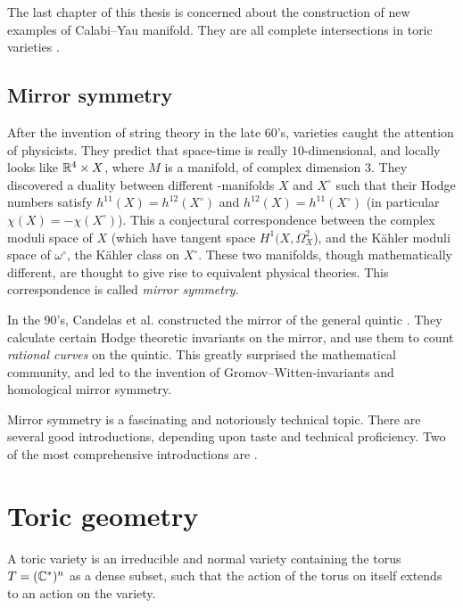 The last chapter of this thesis is concerned about the construction of new examples of Calabi--Yau manifold. They are all complete intersections in toric varieties .

\subsection{Mirror symmetry}

After the invention of string theory in the late 60's, \CY varieties caught the attention of physicists. They predict that space-time is really $10$-dimensional, and locally looks like $\mathbb{R}^4 \times X$, where $M$ is a \CY manifold, of complex dimension $3$. They discovered a duality between different -manifolds $X$ and $X^\circ$ such that their Hodge numbers satisfy $h^{11}(X) = h^{12}(X^\circ)$ and $h^{12}(X)=h^{11}(X^\circ)$ (in particular $\chi(X) = - \chi(X^\circ)$). This a conjectural correspondence between the complex moduli space of $X$ (which have tangent space $H^1(X,\Omega_X^2$), and the Kähler moduli space of $\omega^\circ$, the Kähler class on $X^\circ$. These two manifolds, though mathematically different, are thought to give rise to equivalent physical theories. This correspondence is called \emph{mirror symmetry}.

In the 90's, Candelas et al. constructed the mirror of the general quintic \cite{candelas_string}. They calculate certain Hodge theoretic invariants on the mirror, and use them to count \emph{rational curves} on the quintic. This greatly surprised the mathematical community, and led to the invention of Gromov--Witten-invariants and homological mirror symmetry.

Mirror symmetry is a fascinating and notoriously technical topic. There are several good introductions, depending upon taste and technical proficiency. Two of the most comprehensive introductions are \cite{mirrorsymmetry,mirrorsymmetry_vafa}.


\section{Toric geometry} %
\label{sec:toric_geometry}

A toric variety is an irreducible and normal variety containing the torus $T=(\mathbb{C}^\ast)^n$  as a dense subset, such that the action of the torus on itself extends to an action on the variety.

